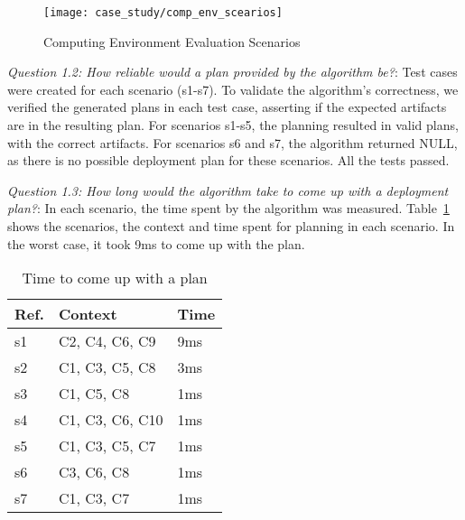 \begin{figure}[!htb]
 \centering
 \texttt{[image: case\_study/comp\_env\_scearios]}
 \caption{Computing Environment Evaluation Scenarios}
\label{fig:variability_scenarios}
\end{figure}


\emph{Question 1.2:  How reliable would a plan provided
by the algorithm be?}: Test cases were created for each scenario (s1-s7).
To validate the algorithm’s correctness,
we verified the generated plans in each test case, asserting if the expected artifacts are in the resulting plan.
For scenarios s1-s5, the planning resulted in valid plans, with the correct artifacts. For scenarios s6 and s7, the algorithm returned NULL, as there is no possible deployment plan for these scenarios. All the tests passed.

\emph{Question 1.3: How long would the algorithm take to come up with a deployment plan?}: In each scenario, the time spent by the algorithm was measured. Table~\ref{table:planning_time} shows the scenarios, the context and time spent for planning in each scenario. In the worst case, it took 9ms to come up with the plan.

\begin{table}[!htb]
\centering
\caption{Time to come up with a plan}
\begin{tabular}{|p{0.7cm}|p{3.75cm}|p{1cm}|}
\hline
  Ref. &
  Context &
  Time \\ \hline

s1 &
C2, C4, C6, C9 &
9ms \\ \hline
s2 &
C1, C3, C5, C8 &
3ms \\ \hline
s3 &
C1, C5, C8 &
1ms \\ \hline
s4 &
C1, C3, C6, C10 &
1ms \\ \hline
s5 &
C1, C3, C5, C7 &
1ms \\ \hline
s6 &
C3, C6, C8 &
1ms \\ \hline
s7 &
C1, C3, C7  &
1ms \\ \hline

\end{tabular}
\label{table:planning_time}
\end{table}


